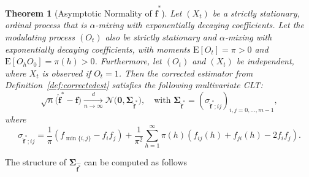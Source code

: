 ﻿\documentclass[12pt,a4paper]{scrreprt}
\newtheorem{theorem}{Theorem}[chapter]
\theoremstyle{definition}
\begin{document}
\begin{theorem}[Asymptotic Normality of $\hat{\boldsymbol{f}}^*$]\label{thm:clt_fstarhat}
Let $(X_t)$ be a strictly stationary, ordinal process that is $\alpha$-mixing with exponentially decaying
coefficients. Let the modulating process $(O_t)$ also be strictly stationary and $\alpha$-mixing with exponentially decaying coefficients, with moments $\mathrm{E}[O_t] = \pi > 0$ and $\mathrm{E}[O_h O_0] = \pi(h) > 0$. Furthermore, let $(O_t)$ and $(X_t)$ be independent, where $X_t$ is observed if $O_t = 1$. Then the corrected estimator from Definition~\ref{def:correctedest} satisfies the following multivariate CLT:
\begin{equation*}\label{eq:clt_fstarhat}
    \sqrt{n}\bigl(\hat{\boldsymbol{f}}^* - \boldsymbol{f}\bigr)
    \xrightarrow[n\to\infty]{d}
    \mathcal{N}\bigl(\boldsymbol{0}, \boldsymbol{\Sigma}_{\hat{\boldsymbol{f}}^*}\bigr),
    \quad \text{with } \boldsymbol{\Sigma}_{\hat{\boldsymbol{f}}^*} = (\sigma_{\hat{\boldsymbol{f}}^*;ij})_{i,j=0,\ldots,m-1},
\end{equation*}
where
\begin{equation*}\label{eq:sigma_fstar}
    \sigma_{\hat{\boldsymbol{f}}^*;ij} = \frac{1}{\pi} (f_{\min \{i,j\}}- f_if_j) + \frac{1}{\pi^2} \sum_{h=1}^{\infty}\pi(h)(f_{ij}(h)+f_{ji}(h)-2f_if_j).
\end{equation*}\end{theorem}
\noindent The structure of $\boldsymbol{\Sigma}_{\hat{\boldsymbol{f}^*}}$ can be computed as follows
\end{document}
